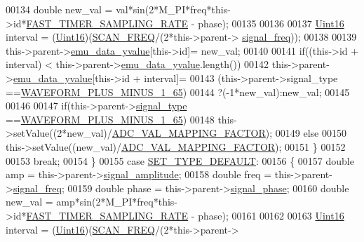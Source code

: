 \begin{DoxyCode}
00134         \textcolor{keywordtype}{double} new\_val = val*sin(2*M\_PI*freq*this->\textcolor{keywordtype}{id}*\hyperlink{a00086_a3a4dcb8af26a561d90607a41a3745806}{FAST\_TIMER\_SAMPLING\_RATE} - 
      phase);
00135 
00136 
00137         \hyperlink{a00004_aae7407b021d43f7193a81a58cfb3e297}{Uint16} interval = (\hyperlink{a00004_aae7407b021d43f7193a81a58cfb3e297}{Uint16})(\hyperlink{a00086_a8127170b687c1f67a968886c128e76e4}{SCAN\_FREQ}/(2*this->parent->
      \hyperlink{a00008_a67039999d520fc483fab521fae5ddde4}{signal\_freq}));
00138 
00139         this->parent->\hyperlink{a00008_ad922d05d1e988d84f404c115fe909f72}{emu\_data\_yvalue}[this->id]= new\_val;
00140 
00141        \textcolor{keywordflow}{if}((this->\textcolor{keywordtype}{id} + interval) < this->parent->\hyperlink{a00008_ad922d05d1e988d84f404c115fe909f72}{emu\_data\_yvalue}.length())
00142         this->parent->\hyperlink{a00008_ad922d05d1e988d84f404c115fe909f72}{emu\_data\_yvalue}[this->id + interval]=
00143         (this->parent->signal\_type ==\hyperlink{a00090_a0923d3b365a36e1e8c401cec964aa36f}{WAVEFORM\_PLUS\_MINUS\_1\_65})
00144         ?(-1*new\_val):new\_val;
00145 
00146 
00147         \textcolor{keywordflow}{if}(this->parent->\hyperlink{a00008_a070edaec5aee6ba1f5a6866bc32c8ce4}{signal\_type} ==\hyperlink{a00090_a0923d3b365a36e1e8c401cec964aa36f}{WAVEFORM\_PLUS\_MINUS\_1\_65})
00148         this->setValue((2*new\_val)/\hyperlink{a00086_ada92d3eeeec0cbeee41e76a52d145792}{ADC\_VAL\_MAPPING\_FACTOR});
00149         \textcolor{keywordflow}{else}
00150         this->setValue((new\_val)/\hyperlink{a00086_ada92d3eeeec0cbeee41e76a52d145792}{ADC\_VAL\_MAPPING\_FACTOR});
00151         \}
00152 
00153     \textcolor{keywordflow}{break};
00154      \}
00155     \textcolor{keywordflow}{case} \hyperlink{a00090_afd1036bf6329d2ac31913e14c1f56725}{SET\_TYPE\_DEFAULT}:
00156     \{
00157         \textcolor{keywordtype}{double} amp     = this->parent->\hyperlink{a00008_a73dabe63bd74afe2776e8136211dc36e}{signal\_amplitude};
00158         \textcolor{keywordtype}{double} freq    = this->parent->\hyperlink{a00008_a67039999d520fc483fab521fae5ddde4}{signal\_freq};
00159         \textcolor{keywordtype}{double} phase   = this->parent->\hyperlink{a00008_af08de88fdfe283086e3cca97a2965678}{signal\_phase};
00160         \textcolor{keywordtype}{double} new\_val = amp*sin(2*M\_PI*freq*this->\textcolor{keywordtype}{id}*\hyperlink{a00086_a3a4dcb8af26a561d90607a41a3745806}{FAST\_TIMER\_SAMPLING\_RATE} - 
      phase);
00161 
00162 
00163         \hyperlink{a00004_aae7407b021d43f7193a81a58cfb3e297}{Uint16} interval = (\hyperlink{a00004_aae7407b021d43f7193a81a58cfb3e297}{Uint16})(\hyperlink{a00086_a8127170b687c1f67a968886c128e76e4}{SCAN\_FREQ}/(2*this->parent->

\end{DoxyCode}
